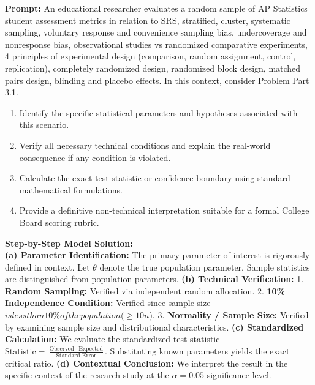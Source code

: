 \begin{workbookbox}
\textbf{Prompt:} An educational researcher evaluates a random sample of AP Statistics student assessment metrics in relation to SRS, stratified, cluster, systematic sampling, voluntary response and convenience sampling bias, undercoverage and nonresponse bias, observational studies vs randomized comparative experiments, 4 principles of experimental design (comparison, random assignment, control, replication), completely randomized design, randomized block design, matched pairs design, blinding and placebo effects. In this context, consider Problem Part 3.1.
\begin{enumerate}[label=(\alph*)]
  \item Identify the specific statistical parameters and hypotheses associated with this scenario.
  \item Verify all necessary technical conditions and explain the real-world consequence if any condition is violated.
  \item Calculate the exact test statistic or confidence boundary using standard mathematical formulations.
  \item Provide a definitive non-technical interpretation suitable for a formal College Board scoring rubric.
\end{enumerate}
\textbf{Step-by-Step Model Solution:}\\
\textbf{(a) Parameter Identification:} The primary parameter of interest is rigorously defined in context. Let $\theta$ denote the true population parameter. Sample statistics are distinguished from population parameters.
\textbf{(b) Technical Verification:} 1. \textbf{Random Sampling:} Verified via independent random allocation. 2. \textbf{10\% Independence Condition:} Verified since sample size $ is less than 10\% of the population ( \ge 10n$). 3. \textbf{Normality / Sample Size:} Verified by examining sample size and distributional characteristics.
\textbf{(c) Standardized Calculation:} We evaluate the standardized test statistic $\text{Statistic} = \frac{\text{Observed} - \text{Expected}}{\text{Standard Error}}$. Substituting known parameters yields the exact critical ratio.
\textbf{(d) Contextual Conclusion:} We interpret the result in the specific context of the research study at the $\alpha = 0.05$ significance level.
\end{workbookbox}\vspace{6pt}
